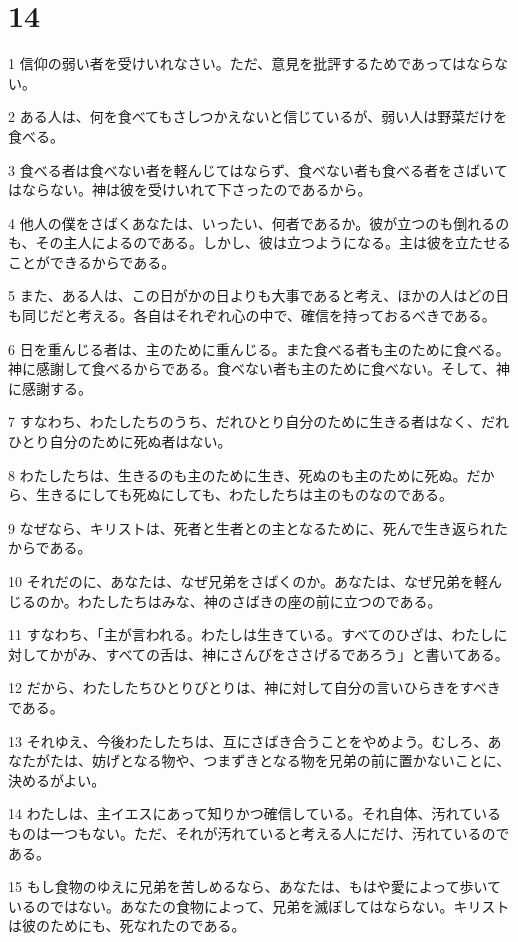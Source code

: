 \chapter{14}

\par 1 信仰の弱い者を受けいれなさい。ただ、意見を批評するためであってはならない。
\par 2 ある人は、何を食べてもさしつかえないと信じているが、弱い人は野菜だけを食べる。
\par 3 食べる者は食べない者を軽んじてはならず、食べない者も食べる者をさばいてはならない。神は彼を受けいれて下さったのであるから。
\par 4 他人の僕をさばくあなたは、いったい、何者であるか。彼が立つのも倒れるのも、その主人によるのである。しかし、彼は立つようになる。主は彼を立たせることができるからである。
\par 5 また、ある人は、この日がかの日よりも大事であると考え、ほかの人はどの日も同じだと考える。各自はそれぞれ心の中で、確信を持っておるべきである。
\par 6 日を重んじる者は、主のために重んじる。また食べる者も主のために食べる。神に感謝して食べるからである。食べない者も主のために食べない。そして、神に感謝する。
\par 7 すなわち、わたしたちのうち、だれひとり自分のために生きる者はなく、だれひとり自分のために死ぬ者はない。
\par 8 わたしたちは、生きるのも主のために生き、死ぬのも主のために死ぬ。だから、生きるにしても死ぬにしても、わたしたちは主のものなのである。
\par 9 なぜなら、キリストは、死者と生者との主となるために、死んで生き返られたからである。
\par 10 それだのに、あなたは、なぜ兄弟をさばくのか。あなたは、なぜ兄弟を軽んじるのか。わたしたちはみな、神のさばきの座の前に立つのである。
\par 11 すなわち、「主が言われる。わたしは生きている。すべてのひざは、わたしに対してかがみ、すべての舌は、神にさんびをささげるであろう」と書いてある。
\par 12 だから、わたしたちひとりびとりは、神に対して自分の言いひらきをすべきである。
\par 13 それゆえ、今後わたしたちは、互にさばき合うことをやめよう。むしろ、あなたがたは、妨げとなる物や、つまずきとなる物を兄弟の前に置かないことに、決めるがよい。
\par 14 わたしは、主イエスにあって知りかつ確信している。それ自体、汚れているものは一つもない。ただ、それが汚れていると考える人にだけ、汚れているのである。
\par 15 もし食物のゆえに兄弟を苦しめるなら、あなたは、もはや愛によって歩いているのではない。あなたの食物によって、兄弟を滅ぼしてはならない。キリストは彼のためにも、死なれたのである。
